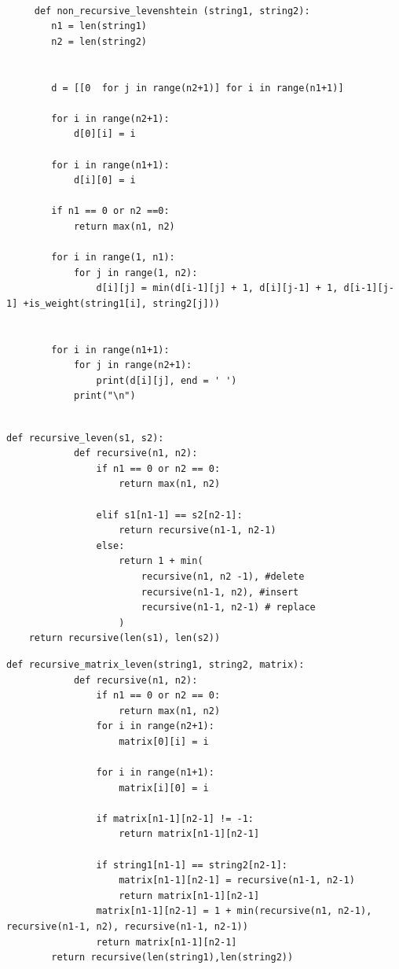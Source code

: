 \documentclass[a4paper]{article}
\begin{document}
	\begin{lstlisting}[label=Iteration_leven,caption=Расстояние Левенштейна(итеративная реализация)]
		
	 def non_recursive_levenshtein (string1, string2):
		n1 = len(string1)
		n2 = len(string2)

		
		d = [[0  for j in range(n2+1)] for i in range(n1+1)]
		
		for i in range(n2+1):
			d[0][i] = i
		
		for i in range(n1+1):
			d[i][0] = i
		
		if n1 == 0 or n2 ==0:
			return max(n1, n2)

		for i in range(1, n1):
			for j in range(1, n2):
				d[i][j] = min(d[i-1][j] + 1, d[i][j-1] + 1, d[i-1][j-1] +is_weight(string1[i], string2[j]))

		
		for i in range(n1+1):
			for j in range(n2+1):
				print(d[i][j], end = ' ')
			print("\n")
		
	\end{lstlisting}
	\clearpage
	\begin{lstlisting}[label=recursive_leven,caption=Расстояние Левенштейна(рекурсивная реализация)]
	def recursive_leven(s1, s2):
			def recursive(n1, n2):
				if n1 == 0 or n2 == 0:
					return max(n1, n2)
		
				elif s1[n1-1] == s2[n2-1]:
					return recursive(n1-1, n2-1)
				else:
					return 1 + min(
						recursive(n1, n2 -1), #delete
						recursive(n1-1, n2), #insert
						recursive(n1-1, n2-1) # replace
					)
	return recursive(len(s1), len(s2))
	\end{lstlisting}
	\clearpage
	\begin{lstlisting}[label=recursive_matrix,caption=Расстояние Левенштейна(рекурсивное заполнение матрицы)]
		def recursive_matrix_leven(string1, string2, matrix):
			def recursive(n1, n2):
				if n1 == 0 or n2 == 0:
					return max(n1, n2)
				for i in range(n2+1):
					matrix[0][i] = i
		
				for i in range(n1+1):
					matrix[i][0] = i
		
				if matrix[n1-1][n2-1] != -1:
					return matrix[n1-1][n2-1]
		
				if string1[n1-1] == string2[n2-1]:
					matrix[n1-1][n2-1] = recursive(n1-1, n2-1)
					return matrix[n1-1][n2-1]
				matrix[n1-1][n2-1] = 1 + min(recursive(n1, n2-1), recursive(n1-1, n2), recursive(n1-1, n2-1))
				return matrix[n1-1][n2-1]
		return recursive(len(string1),len(string2))
	\end{lstlisting}
\end{document}
